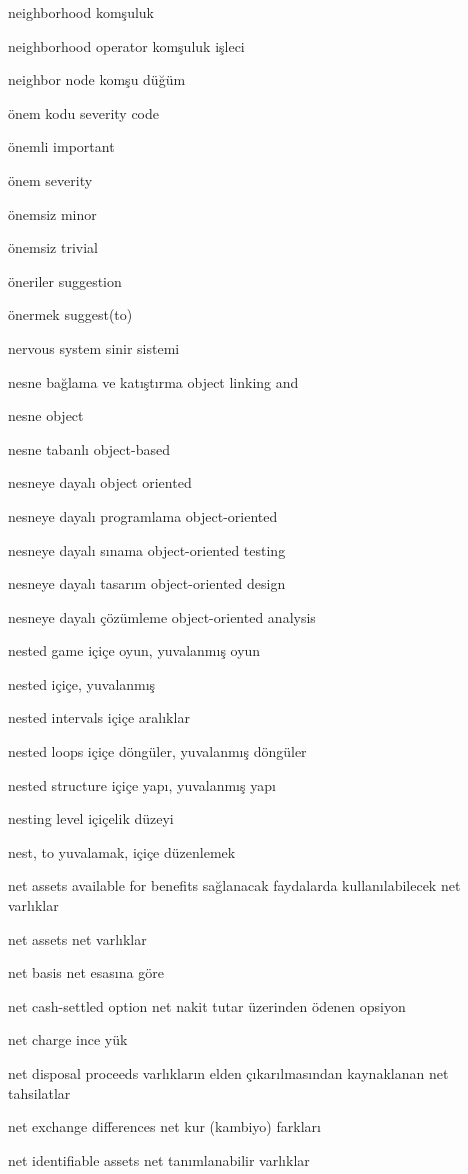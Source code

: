 \documentclass[12pt,fleqn]{article}\usepackage{../../common}
\begin{document}
neighborhood komşuluk

neighborhood operator komşuluk işleci

neighbor node komşu düğüm

önem kodu severity code

önemli important

önem severity

önemsiz minor

önemsiz trivial

öneriler suggestion

önermek suggest(to)

nervous system sinir sistemi

nesne bağlama ve katıştırma object linking and

nesne object

nesne tabanlı object-based

nesneye dayalı object oriented

nesneye dayalı programlama object-oriented

nesneye dayalı sınama object-oriented testing

nesneye dayalı tasarım object-oriented design

nesneye dayalı çözümleme object-oriented analysis

nested game içiçe oyun, yuvalanmış oyun

nested içiçe, yuvalanmış

nested intervals içiçe aralıklar

nested loops içiçe döngüler, yuvalanmış döngüler

nested structure içiçe yapı, yuvalanmış yapı

nesting level içiçelik düzeyi

nest, to yuvalamak, içiçe düzenlemek

net assets available for benefits sağlanacak faydalarda kullanılabilecek net varlıklar

net assets net varlıklar

net basis net esasına göre

net cash-settled option net nakit tutar üzerinden ödenen opsiyon

net charge ince yük

net disposal proceeds varlıkların elden çıkarılmasından kaynaklanan net tahsilatlar

net exchange differences net kur (kambiyo) farkları

net identifiable assets net tanımlanabilir varlıklar
\end{document}
